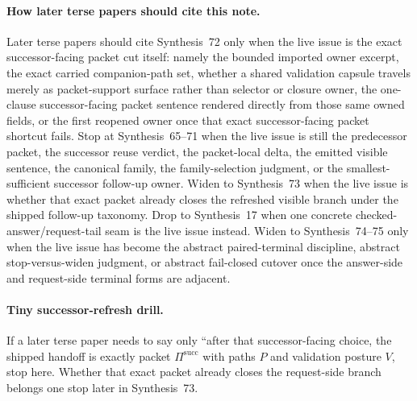 \documentclass[11pt]{article}
\begin{document}
\paragraph{How later terse papers should cite this note.}
Later terse papers should cite Synthesis~72 only when the live issue is the exact successor-facing packet cut itself: namely the bounded imported owner excerpt, the exact carried companion-path set, whether a shared validation capsule travels merely as packet-support surface rather than selector or closure owner, the one-clause successor-facing packet sentence rendered directly from those same owned fields, or the first reopened owner once that exact successor-facing packet shortcut fails. Stop at Synthesis~65--71 when the live issue is still the predecessor packet, the successor reuse verdict, the packet-local delta, the emitted visible sentence, the canonical family, the family-selection judgment, or the smallest-sufficient successor follow-up owner. Widen to Synthesis~73 when the live issue is whether that exact packet already closes the refreshed visible branch under the shipped follow-up taxonomy. Drop to Synthesis~17 when one concrete checked-answer/request-tail seam is the live issue instead. Widen to Synthesis~74--75 only when the live issue has become the abstract paired-terminal discipline, abstract stop-versus-widen judgment, or abstract fail-closed cutover once the answer-side and request-side terminal forms are adjacent.\cite{series:publicrequestresponsepackets,series:publicrequestresponsepacketcarryforward,series:publicrequestresponsepacketdeltas,series:publicrequestresponsepacketrefreshnotices,series:publicrequestresponsepacketrefreshnoticenormalforms,series:publicrequestresponsepacketrefreshnoticeselections,series:publicrequestresponsepacketrefreshresponsemenus,series:publicrequestresponsepacketrefreshresponsepacketclosureverdicts,series:pairedterminalcitationdiscipline,series:pairedterminalcutoverrules,series:workedexample}

\paragraph{Tiny successor-refresh drill.}
If a later terse paper needs to say only ``after that successor-facing choice, the shipped handoff is exactly packet $\Pi^{\mathrm{succ}}$ with paths $P$ and validation posture $V$, stop here. Whether that exact packet already closes the request-side branch belongs one stop later in Synthesis~73.
\end{document}
